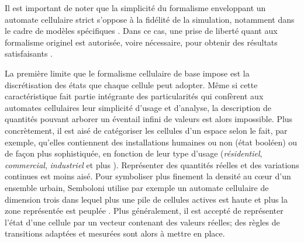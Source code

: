 \documentclass[12pt]{article}
\begin{document}
Il est important de noter que la simplicité du formalisme enveloppant
un automate cellulaire strict s'oppose à la fidélité de la simulation,
notamment dans le cadre de modèles spécifiques
\cite{Torrens2000,Torrens2001}. Dans ce cas, une prise de liberté
quant aux formalisme originel est autorisée, voire nécessaire, pour
obtenir des résultats satisfaisants \cite{White1998}.

La première limite que le formalisme cellulaire de base impose est la
discrétisation des états que chaque cellule peut adopter. Même si
cette caractéristique fait partie intégrante des particularités qui
confèrent aux automates cellulaires leur simplicité d'usage et
d'analyse, la description de quantités pouvant arborer un éventail
infini de valeurs est alors impossible. Plus concrètement, il est aisé
de catégoriser les cellules d'un espace selon le fait, par exemple,
qu'elles contiennent des installations humaines ou non (état booléen)
\cite{Benguigui2004,Cornu2008} ou de façon plus sophistiquée, en
fonction de leur type d'usage (\textit{résidentiel},
\textit{commercial}, \textit{industriel} \cite{Lechner} et plus
\cite{Dubos-Paillard2003}). Représenter des quantités réelles et des
variations continues est moins aisé. Pour symboliser plus finement la
densité au c\oe ur d'un ensemble urbain, Semboloni utilise par exemple
un automate cellulaire de dimension trois dans lequel plus une pile de
cellules actives est haute et plus la zone représentée est peuplée
\cite{Semboloni2000}. Plus généralement, il est accepté de représenter
l'état d'une cellule par un vecteur contenant des valeurs réelles; des
règles de transitions adaptées et mesurées sont alors à mettre en
place.
\end{document}
